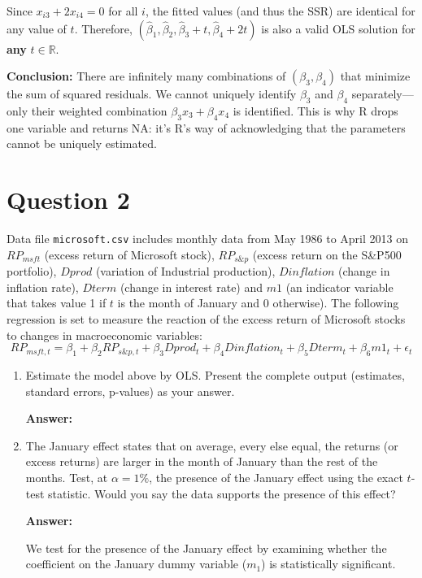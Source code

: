 \documentclass[12pt,a4paper]{article}
\begin{document}
\begin{enumerate}[label=(\roman*)]
Since $x_{i3} + 2x_{i4} = 0$ for all $i$, the fitted values (and thus the SSR) are identical for any value of $t$. 
Therefore, $(\hat{\beta}_1, \hat{\beta}_2, \hat{\beta}_3 + t, \hat{\beta}_4 + 2t)$ is also a valid OLS solution for \textbf{any} $t \in \mathbb{R}$.

\textbf{Conclusion:} There are infinitely many combinations of $(\beta_3, \beta_4)$ that minimize the sum of squared residuals. 
We cannot uniquely identify $\beta_3$ and $\beta_4$ separately—only their weighted combination $\beta_3 x_3 + \beta_4 x_4$ is identified. 
This is why R drops one variable and returns NA: it's R's way of acknowledging that the parameters cannot be uniquely estimated.

\newpage

\section*{Question 2}
Data file \texttt{microsoft.csv} includes monthly data from May 1986 to April 2013 on $RP_{msft}$ (excess return of Microsoft stock), $RP_{s\&p}$ (excess return on the S\&P500 portfolio), $Dprod$ (variation of Industrial production), $Dinflation$ (change in inflation rate), $Dterm$ (change in interest rate) and $m1$ (an indicator variable that takes value 1 if $t$ is the month of January and 0 otherwise). The following regression is set to measure the reaction of the excess return of Microsoft stocks to changes in macroeconomic variables:
\[
RP_{msft,t} = \beta_1 + \beta_2 RP_{s\&p,t} + \beta_3 Dprod_t + \beta_4 Dinflation_t + \beta_5 Dterm_t + \beta_6 m1_t + \epsilon_t
\]

\begin{enumerate}[label=(\alph*)]
  \item Estimate the model above by OLS. Present the complete output (estimates, standard errors, p-values) as your answer.
  
  \textbf{Answer:} 

  
  
  \item The January effect states that on average, every else equal, the returns (or excess returns) are larger in the month of January than the rest of the months. Test, at $\alpha = 1\%$, the presence of the January effect using the exact $t$-test statistic. Would you say the data supports the presence of this effect?
  
  \textbf{Answer:} 

  We test for the presence of the January effect by examining whether the coefficient on the January dummy variable ($m_1$) is statistically significant.


\end{enumerate}
\end{enumerate}
\end{document}
